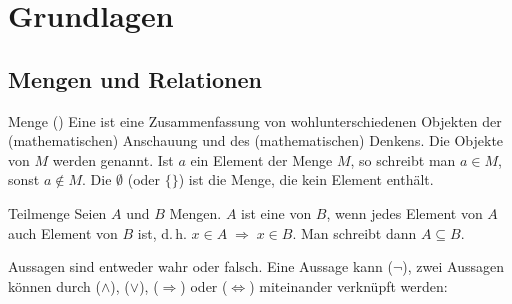\chapter{%
    Grundlagen%
}

\section{%
    Mengen und Relationen%
}

\begin{Def}{Menge ()}
    Eine  ist eine Zusammenfassung von wohlunterschiedenen
    Objekten der (mathematischen) Anschauung und des (mathematischen) Denkens.
    Die Objekte von $M$ werden  genannt.
    Ist $a$ ein Element der Menge $M$, so schreibt man $a \in M$, sonst
    $a \notin M$.
    Die  $\emptyset$ (oder $\{\}$) ist die Menge, die
    kein Element enthält.
\end{Def}

\begin{Def}{Teilmenge}
    Seien $A$ und $B$ Mengen.
    $A$ ist eine  von $B$, wenn jedes Element von $A$ auch
    Element von $B$ ist, d.\,h. $x \in A \;\Rightarrow\; x \in B$.
    Man schreibt dann $A \subseteq B$.
\end{Def}

\begin{Def}{Aussagen}
     sind entweder wahr oder falsch.
    Eine Aussage kann  ($\lnot$), zwei Aussagen können durch
     ($\land$),  ($\lor$),
     ($\Rightarrow$) oder
     ($\Leftrightarrow$)
    miteinander verknüpft werden: \\
\end{Def}

